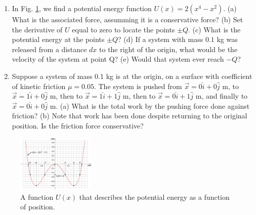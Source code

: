 \documentclass{article}
\begin{document}
\begin{enumerate}
\item In Fig. \ref{fig:1}, we find a potential energy function $U(x) = 2(x^4 - x^2)$. (a) What is the associated force, assumming it is a conservative force? (b) Set the derivative of $U$ equal to zero to locate the points $\pm Q$. (c) What is the potential energy at the points $\pm Q$? (d) If a system with mass $0.1$ kg was released from a distance $dx$ to the right of the origin, what would be the velocity of the system at point Q?  (e) Would that system ever reach $-Q$? \\ \vspace{3cm}
\item Suppose a system of mass 0.1 kg is at the origin, on a surface with coefficient of kinetic friction $\mu = 0.05$.  The system is pushed from $\vec{x} = 0\hat{i}+0\hat{j}$ m, to $\vec{x} = 1\hat{i}+0\hat{j}$ m, then to $\vec{x} = 1\hat{i} + 1\hat{j}$ m, then to $\vec{x} = 0\hat{i} + 1\hat{j}$ m, and finally to $\vec{x} = 0\hat{i}+0\hat{j}$ m.  (a) What is the total work by the pushing force done against friction?  (b) Note that work has been done despite returning to the original position.  Is the friction force conservative?
\end{enumerate}

\begin{figure}
\centering
\includegraphics[width=0.33\textwidth]{figures/PE.jpeg}
\caption{\label{fig:1} A function $U(x)$ that describes the potential energy as a function of position.}
\end{figure}
\end{document}
